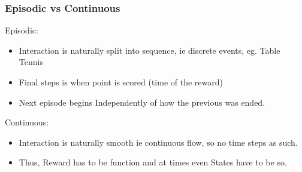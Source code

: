 \begin{frame}[fragile]\frametitle{Episodic vs Continuous}

Episodic:
\begin{itemize}
\item Interaction is naturally split into sequence, ie discrete events, eg. Table Tennis
\item Final steps is when point is scored (time of the reward)
\item Next episode begins Independently of how the previous was ended.
\end{itemize}

Continuous:
\begin{itemize}
\item Interaction is naturally smooth ie continuous flow, so no time steps as such.
\item Thus, Reward has to be function and at times even States have to be so.
\end{itemize}

\end{frame}



